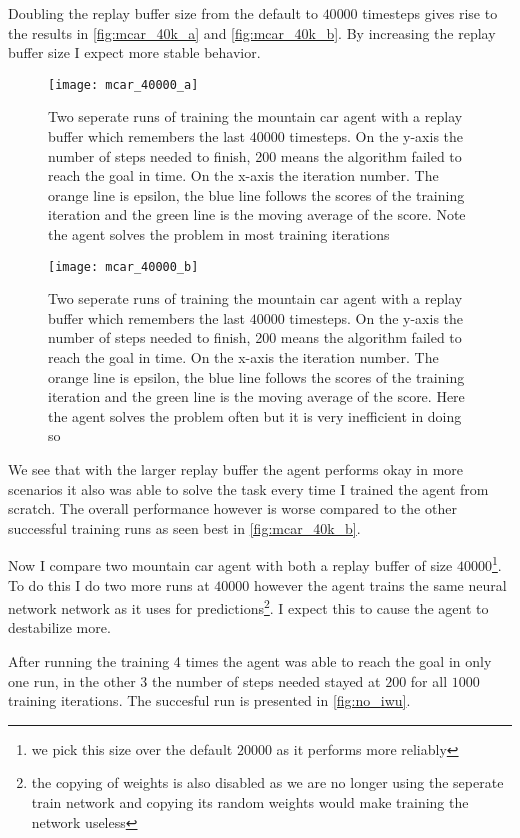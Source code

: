Doubling the replay buffer size from the default to $40 000$ timesteps gives rise to the results in \autoref{fig:mcar_40k_a} and \autoref{fig:mcar_40k_b}. By increasing the replay buffer size I expect more stable behavior. 

\begin{figure}
    \texttt{[image: mcar\_40000\_a]}
    \caption{Two seperate runs of training the mountain car agent with a replay buffer which remembers the last $40000$ timesteps. On the y-axis the number of steps needed to finish, 200 means the algorithm failed to reach the goal in time. On the x-axis the iteration number. The orange line is epsilon, the blue line follows the scores of the training iteration and the green line is the moving average of the score. Note the agent solves the problem in most training iterations}
    \label{fig:mcar_40k_a}
\end{figure}

\begin{figure}
    \texttt{[image: mcar\_40000\_b]}
    \caption{Two seperate runs of training the mountain car agent with a replay buffer which remembers the last $40000$ timesteps. On the y-axis the number of steps needed to finish, 200 means the algorithm failed to reach the goal in time. On the x-axis the iteration number. The orange line is epsilon, the blue line follows the scores of the training iteration and the green line is the moving average of the score. Here the agent solves the problem often but it is very inefficient in doing so}
    \label{fig:mcar_40k_b}
\end{figure}

We see that with the larger replay buffer the agent performs okay in more scenarios it also was able to solve the task every time I trained the agent from scratch. The overall performance however is worse compared to the other successful training runs as seen best in \autoref{fig:mcar_40k_b}.

Now I compare two mountain car agent with both a replay buffer of size $40 000$\footnote{we pick this size over the default $20 000$ as it performs more reliably}. To do this I do two more runs at $40 000$ however the agent trains the same neural network network as it uses for predictions\footnote{the copying of weights is also disabled as we are no longer using the seperate train network and copying its random weights would make training the network useless}. I expect this to cause the agent to destabilize more.

After running the training 4 times the agent was able to reach the goal in only one run, in the other 3 the number of steps needed stayed at $200$ for all $1000$ training iterations. The succesful run is presented in \autoref{fig:no_iwu}.

